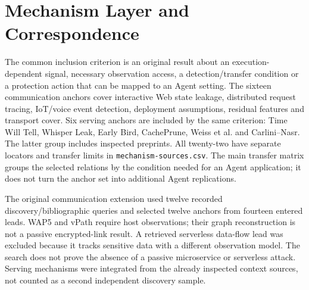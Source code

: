\section{Mechanism Layer and Correspondence}\label{supp:mechanisms}
The common inclusion criterion is an original result about an execution-dependent signal, necessary observation access, a detection/transfer condition or a protection action that can be mapped to an Agent setting. The sixteen communication anchors cover interactive Web state leakage, distributed request tracing, IoT/voice event detection, deployment assumptions, residual features and transport cover. Six serving anchors are included by the same criterion: Time Will Tell, Whisper Leak, Early Bird, CachePrune, Weiss et al. and Carlini--Nasr. The latter group includes inspected preprints. All twenty-two have separate locators and transfer limits in \texttt{mechanism-sources.csv}. The main transfer matrix groups the selected relations by the condition needed for an Agent application; it does not turn the anchor set into additional Agent replications.

The original communication extension used twelve recorded discovery/bibliographic queries and selected twelve anchors from fourteen entered leads. WAP5 and vPath require host observations; their graph reconstruction is not a passive encrypted-link result. A retrieved serverless data-flow lead was excluded because it tracks sensitive data with a different observation model. The search does not prove the absence of a passive microservice or serverless attack. Serving mechanisms were integrated from the already inspected context sources, not counted as a second independent discovery sample.

